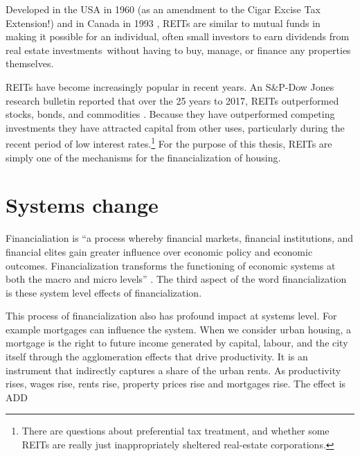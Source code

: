 Developed in the USA  in 1960 (as an amendment to the Cigar Excise Tax Extension!) and in Canada in 1993 \cite{GET_REITsDevelopedDates}, REITs are similar to mutual funds in making it possible for an individual, often small investors to earn dividends from real estate investments without having to buy, manage, or finance any properties themselves. 

REITs have become increasingly popular in recent years.  An S\&P-Dow Jones research bulletin reported that over the  25 years to 2017, REITs outperformed stocks, bonds, and commodities \cite{GET-Dow-Jones-research-bulletin}. %
Because they have outperformed competing investments they have attracted  capital from other uses, particularly during the recent period of low interest rates.\footnote{There are questions about preferential tax treatment, and whether some REITs are really just inappropriately sheltered real-estate corporations.} For the purpose of this thesis, REITs are simply one of the mechanisms for the financialization of housing.



\section{Systems change}
Financialiation is %
``a process whereby financial markets, financial institutions, and financial elites gain greater influence over economic policy and economic outcomes. Financialization transforms the functioning of economic systems at both the macro and micro levels'' \cite{palleyFinancializationWhatIt2007}. 
The third aspect of the word financialization is these system level effects of financialization. 

This process of financialization also has profound impact at systems level. 
For example mortgages can influence the system. When we consider urban housing, a mortgage is the right to future income generated by capital, labour, and the city itself through the agglomeration effects that drive productivity. It is an instrument that indirectly captures a share of the urban rents. As productivity rises, wages rise, rents rise, property prices rise and mortgages rise. The effect is ADD

